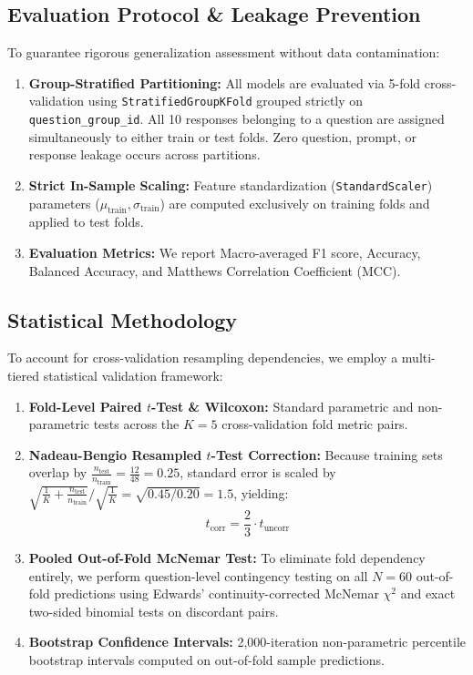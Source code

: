 \documentclass[conference]{IEEEtran}
\begin{document}
\subsection{Evaluation Protocol \& Leakage Prevention}
To guarantee rigorous generalization assessment without data contamination:
\begin{enumerate}
    \item \textbf{Group-Stratified Partitioning:} All models are evaluated via 5-fold cross-validation using \texttt{StratifiedGroupKFold} grouped strictly on \texttt{question\_group\_id}. All 10 responses belonging to a question are assigned simultaneously to either train or test folds. Zero question, prompt, or response leakage occurs across partitions.
    \item \textbf{Strict In-Sample Scaling:} Feature standardization (\texttt{StandardScaler}) parameters ($\mu_{\text{train}}, \sigma_{\text{train}}$) are computed exclusively on training folds and applied to test folds.
    \item \textbf{Evaluation Metrics:} We report Macro-averaged F1 score, Accuracy, Balanced Accuracy, and Matthews Correlation Coefficient (MCC).
\end{enumerate}

\subsection{Statistical Methodology}
To account for cross-validation resampling dependencies, we employ a multi-tiered statistical validation framework:
\begin{enumerate}
    \item \textbf{Fold-Level Paired $t$-Test \& Wilcoxon:} Standard parametric and non-parametric tests across the $K=5$ cross-validation fold metric pairs.
    \item \textbf{Nadeau-Bengio Resampled $t$-Test Correction:} Because training sets overlap by $\frac{n_{\text{test}}}{n_{\text{train}}} = \frac{12}{48} = 0.25$, standard error is scaled by $\sqrt{\frac{1}{K} + \frac{n_{\text{test}}}{n_{\text{train}}}} / \sqrt{\frac{1}{K}} = \sqrt{0.45 / 0.20} = 1.5$, yielding:
    \begin{equation}
    t_{\text{corr}} = \frac{2}{3} \cdot t_{\text{uncorr}}
    \end{equation}
    \item \textbf{Pooled Out-of-Fold McNemar Test:} To eliminate fold dependency entirely, we perform question-level contingency testing on all $N=60$ out-of-fold predictions using Edwards' continuity-corrected McNemar $\chi^2$ and exact two-sided binomial tests on discordant pairs.
    \item \textbf{Bootstrap Confidence Intervals:} 2,000-iteration non-parametric percentile bootstrap intervals computed on out-of-fold sample predictions.
\end{enumerate}
\end{document}
